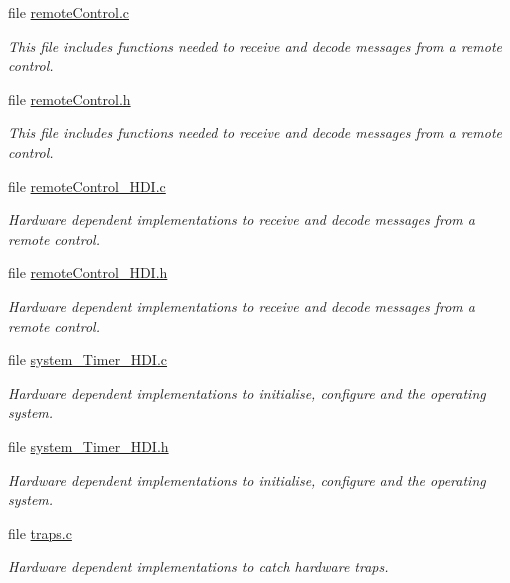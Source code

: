 \begin{DoxyCompactItemize}
file \hyperlink{remoteControl_8c}{remote\+Control.\+c}
\begin{DoxyCompactList}\small\item\em This file includes functions needed to receive and decode messages from a remote control. \end{DoxyCompactList}\item 
file \hyperlink{remoteControl_8h}{remote\+Control.\+h}
\begin{DoxyCompactList}\small\item\em This file includes functions needed to receive and decode messages from a remote control. \end{DoxyCompactList}\item 
file \hyperlink{remoteControl__HDI_8c}{remote\+Control\+\_\+\+H\+D\+I.\+c}
\begin{DoxyCompactList}\small\item\em Hardware dependent implementations to receive and decode messages from a remote control. \end{DoxyCompactList}\item 
file \hyperlink{remoteControl__HDI_8h}{remote\+Control\+\_\+\+H\+D\+I.\+h}
\begin{DoxyCompactList}\small\item\em Hardware dependent implementations to receive and decode messages from a remote control. \end{DoxyCompactList}\item 
file \hyperlink{system__Timer__HDI_8c}{system\+\_\+\+Timer\+\_\+\+H\+D\+I.\+c}
\begin{DoxyCompactList}\small\item\em Hardware dependent implementations to initialise, configure and the operating system. \end{DoxyCompactList}\item 
file \hyperlink{system__Timer__HDI_8h}{system\+\_\+\+Timer\+\_\+\+H\+D\+I.\+h}
\begin{DoxyCompactList}\small\item\em Hardware dependent implementations to initialise, configure and the operating system. \end{DoxyCompactList}\item 
file \hyperlink{traps_8c}{traps.\+c}
\begin{DoxyCompactList}\small\item\em Hardware dependent implementations to catch hardware traps. \end{DoxyCompactList}\item 

\end{DoxyCompactItemize}
